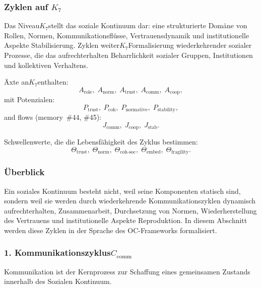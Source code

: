 
\subsubsection{Zyklen auf \texorpdfstring{$K_7$}{K_7}}
\label{sec:cycles-k7}

Das Niveau$K_7$stellt das soziale Kontinuum dar: eine strukturierte Domäne von
Rollen, Normen, Kommunikationsflüsse, Vertrauensdynamik und institutionelle Aspekte
Stabilisierung.
Zyklen weiter$K_7$Formalisierung wiederkehrender sozialer Prozesse, die das aufrechterhalten
Beharrlichkeit sozialer Gruppen, Institutionen und kollektiven Verhaltens.

Äxte an$K_7$enthalten:
\[
  A_{\mathrm{role}},\;
  A_{\mathrm{norm}},\;
  A_{\mathrm{trust}},\;
  A_{\mathrm{comm}},\;
  A_{\mathrm{coop}},
\]
mit Potenzialen:
\[
  P_{\mathrm{trust}},\;
  P_{\mathrm{coh}},\;
  P_{\mathrm{normative}},\;
  P_{\mathrm{stability}},
\]
and flows (memory~\#44, \#45):
\[
  J_{\mathrm{comm}},\;
  J_{\mathrm{coop}},\;
  J_{\mathrm{stab}}.
\]

Schwellenwerte, die die Lebensfähigkeit des Zyklus bestimmen:
\[
  \Theta_{\mathrm{trust}},\;
  \Theta_{\mathrm{norm}},\;
  \Theta_{\mathrm{coh\text{-}soc}},\;
  \Theta_{\mathrm{embed}},\;
  \Theta_{\mathrm{fragility}}.
\]

\subsubsection{Überblick}

Ein soziales Kontinuum besteht nicht, weil seine Komponenten statisch sind, sondern weil
sie werden durch wiederkehrende Kommunikationszyklen dynamisch aufrechterhalten,
Zusammenarbeit, Durchsetzung von Normen, Wiederherstellung des Vertrauens und institutionelle Aspekte
Reproduktion.
In diesem Abschnitt werden diese Zyklen in der Sprache des OC-Frameworks formalisiert.

\subsubsection{1. Kommunikationszyklus$C_{\mathrm{comm}}$}

Kommunikation ist der Kernprozess zur Schaffung eines gemeinsamen Zustands innerhalb des Sozialen
Kontinuum.

